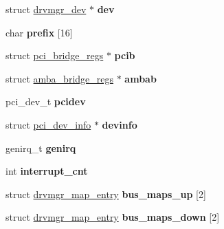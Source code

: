 \begin{DoxyCompactItemize}
\item 
\mbox{\label{structgr701__priv_a2236ea5b3aada55610c153bbc2a1b4d0}} 
struct \mbox{\hyperlink{structdrvmgr__dev}{drvmgr\+\_\+dev}} $\ast$ {\bfseries dev}
\item 
\mbox{\label{structgr701__priv_aa664dee4f66ac544e0d6ad7279850f7c}} 
char {\bfseries prefix} \mbox{[}16\mbox{]}
\item 
\mbox{\label{structgr701__priv_a67e6caa6591188c0c9a52d8f54f9d0ec}} 
struct \mbox{\hyperlink{structpci__bridge__regs}{pci\+\_\+bridge\+\_\+regs}} $\ast$ {\bfseries pcib}
\item 
\mbox{\label{structgr701__priv_ab9037fd85fb6ff739a707356c9e01d2a}} 
struct \mbox{\hyperlink{structamba__bridge__regs}{amba\+\_\+bridge\+\_\+regs}} $\ast$ {\bfseries ambab}
\item 
\mbox{\label{structgr701__priv_aed34659898b8c2195fb164ade46b7871}} 
pci\+\_\+dev\+\_\+t {\bfseries pcidev}
\item 
\mbox{\label{structgr701__priv_a2180da7aef2471b09ab0cf909a83a346}} 
struct \mbox{\hyperlink{structpci__dev__info}{pci\+\_\+dev\+\_\+info}} $\ast$ {\bfseries devinfo}
\item 
\mbox{\label{structgr701__priv_ace0be9b0605a8a0ceea2d9f336e98496}} 
genirq\+\_\+t {\bfseries genirq}
\item 
\mbox{\label{structgr701__priv_af023a9cf49408c68d66d4206bb7de130}} 
int {\bfseries interrupt\+\_\+cnt}
\item 
\mbox{\label{structgr701__priv_a2eb808dea7c5895441927ab312b02bfb}} 
struct \mbox{\hyperlink{structdrvmgr__map__entry}{drvmgr\+\_\+map\+\_\+entry}} {\bfseries bus\+\_\+maps\+\_\+up} \mbox{[}2\mbox{]}
\item 
\mbox{\label{structgr701__priv_a9b153f5674559101f4f17327aea1d66f}} 
struct \mbox{\hyperlink{structdrvmgr__map__entry}{drvmgr\+\_\+map\+\_\+entry}} {\bfseries bus\+\_\+maps\+\_\+down} \mbox{[}2\mbox{]}

\end{DoxyCompactItemize}
